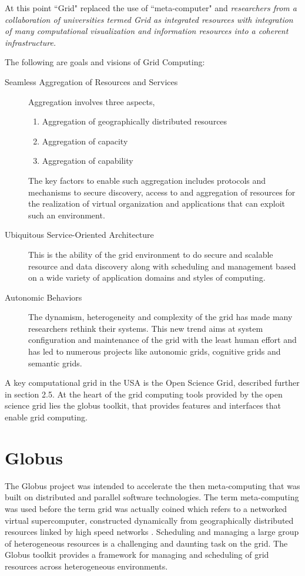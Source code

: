 \documentclass[ms,electronic,double]{nuthesis}
\begin{document}
At this point ``Grid" replaced the use of ``meta-computer" and \emph{ researchers from 
a collaboration of universities termed Grid as integrated resources 
with integration of many computational visualization and information resources 
into a coherent infrastructure.}

The following are goals and visions of Grid Computing:


\begin{description}
  \item[Seamless Aggregation of Resources and Services]
  Aggregation involves three aspects, 
  \begin{enumerate}
    \item{Aggregation of geographically distributed resources}
    \item{Aggregation of capacity}
    \item{Aggregation of capability}
      \end{enumerate}
    The key factors to enable such aggregation includes protocols and mechanisms 
    to secure discovery, access to and aggregation of resources for the 
    realization of virtual organization and applications that can exploit such 
    an environment.

  \item[Ubiquitous Service-Oriented Architecture] This is the ability of the grid 
  environment to do secure and scalable resource and data discovery along with scheduling and 
  management based on a wide variety of application domains and styles of 
  computing.
  
  \item[Autonomic Behaviors]
  The dynamism, heterogeneity and complexity of the grid has made many 
  researchers rethink their systems. This new trend aims at system configuration 
  and maintenance of the grid with the least human effort and has led to numerous 
  projects like autonomic grids, cognitive grids and semantic grids.
  
\end{description}

A key computational grid in the USA is the Open Science Grid, described further 
in section 2.5.
At the heart of the grid computing tools provided by the open science grid lies the globus toolkit, that provides
features and interfaces that enable grid computing. 
\section{Globus}
The Globus project was intended to accelerate the then meta-computing that was built on 
distributed and parallel software technologies. The term meta-computing was used 
before the term grid was actually coined which refers to 
a networked virtual supercomputer, constructed dynamically from geographically 
distributed resources linked by high speed networks \cite{globus}. Scheduling 
and managing a large group of heterogeneous resources is a challenging and 
daunting task on the grid. The Globus toolkit provides a framework for managing 
and scheduling of grid resources across heterogeneous environments.
\end{document}
